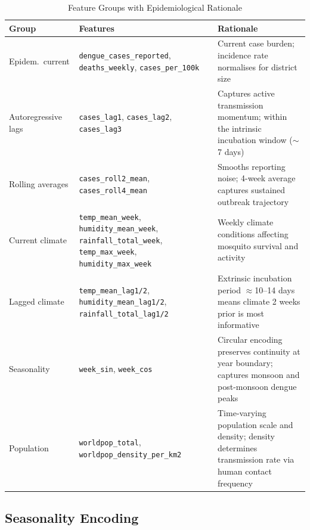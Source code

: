 \documentclass[conference]{IEEEtran}
\begin{document}
\begin{table}[htbp]
  \caption{Feature Groups with Epidemiological Rationale}
  \label{tab:features}
  \centering
  \renewcommand{\arraystretch}{1.15}
  \setlength{\tabcolsep}{4pt}
  \begin{tabular}{L{1.6cm} L{3.0cm} L{2.8cm}}
    \toprule
    \textbf{Group} & \textbf{Features} & \textbf{Rationale} \\
    \midrule
    Epidem.\ current &
      \texttt{dengue\_cases\_reported},
      \texttt{deaths\_weekly},
      \texttt{cases\_per\_100k} &
      Current case burden; incidence rate normalises for district size \\
    \midrule
    Autoregressive lags &
      \texttt{cases\_lag1},
      \texttt{cases\_lag2},
      \texttt{cases\_lag3} &
      Captures active transmission momentum; within the intrinsic
      incubation window ($\sim$7 days) \\
    \midrule
    Rolling averages &
      \texttt{cases\_roll2\_mean},
      \texttt{cases\_roll4\_mean} &
      Smooths reporting noise; 4-week average captures sustained outbreak
      trajectory \\
    \midrule
    Current climate &
      \texttt{temp\_mean\_week},
      \texttt{humidity\_mean\_week},
      \texttt{rainfall\_total\_week},
      \texttt{temp\_max\_week},
      \texttt{humidity\_max\_week} &
      Weekly climate conditions affecting mosquito survival and
      activity \\
    \midrule
    Lagged climate &
      \texttt{temp\_mean\_lag1/2},
      \texttt{humidity\_mean\_lag1/2},
      \texttt{rainfall\_total\_lag1/2} &
      Extrinsic incubation period $\approx$10--14 days means climate
      2 weeks prior is most informative \\
    \midrule
    Seasonality &
      \texttt{week\_sin},
      \texttt{week\_cos} &
      Circular encoding preserves continuity at year boundary;
      captures monsoon and post-monsoon dengue peaks \\
    \midrule
    Population &
      \texttt{worldpop\_total},
      \texttt{worldpop\_density\_per\_km2} &
      Time-varying population scale and density; density determines
      transmission rate via human contact frequency \\
    \bottomrule
  \end{tabular}
\end{table}

\subsection{Seasonality Encoding}
\label{subsec:seasonality}
\end{document}

